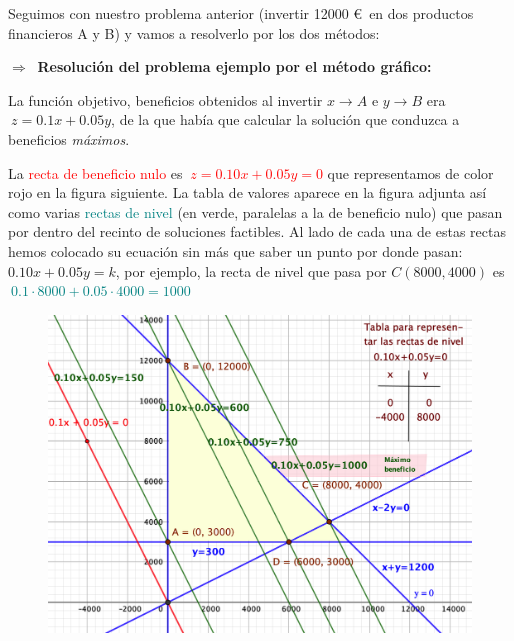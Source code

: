 \vspace{4mm}
Seguimos con nuestro problema anterior \textcolor{gris}{(invertir 12000 \euro $\,$ en dos productos financieros A y B)} y vamos a resolverlo por los dos métodos:

\vspace{10mm} %
$\Longrightarrow \ $ \vspace{5mm} \textbf{Resolución del problema ejemplo por el método gráfico:}

La función objetivo, beneficios obtenidos al invertir $x\to A$ e $y\to B$ era $\ z=0.1 x+0.05 y$, de la que había que calcular la solución que conduzca a beneficios \emph{máximos}.

La \textcolor{red}{recta de beneficio nulo} es \textcolor{red}{$\ z=0.10x+0.05y=0$} que representamos de color rojo en la figura siguiente. La tabla de valores aparece en la figura adjunta así como varias \textcolor{teal}{rectas de nivel} (en verde, paralelas a la de beneficio nulo) que pasan por dentro del recinto de soluciones factibles. Al lado de cada una de estas rectas hemos colocado su ecuación sin más que saber un punto por donde pasan: $0.10x+0.05y=k$, por ejemplo, la recta de nivel que pasa por $C(8000,4000)$ es \textcolor{teal}{$\ 0.1\cdot 8000 + 0.05 \cdot 4000 = 1000$}

\vspace{5mm} %

\begin{figure}[H]
	\centering
	\includegraphics[width=.95\textwidth]{imagenes/img12.png}
\end{figure}

